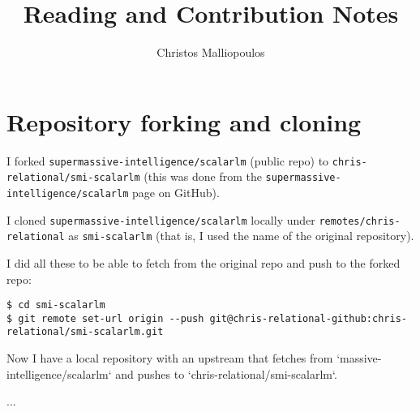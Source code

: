 \documentclass[a4paper, 10pt]{article}
\begin{document}
\title{Reading and Contribution Notes}
\author{Christos Malliopoulos}
\maketitle
\tableofcontents



\section{Repository forking and cloning}
I forked \texttt{supermassive-intelligence/scalarlm} (public repo) to \texttt{chris-relational/smi-scalarlm} (this was done from the \texttt{supermassive-intelligence/scalarlm} page on GitHub).

I cloned \texttt{supermassive-intelligence/scalarlm} locally under \texttt{remotes/chris-relational} as \texttt{smi-scalarlm} (that is, I used the name of the original repository).

I did all these to be able to fetch from the original repo and push to the forked repo:  
\begin{lstlisting}[style=all]
$ cd smi-scalarlm
$ git remote set-url origin --push git@chris-relational-github:chris-relational/smi-scalarlm.git
\end{lstlisting}

Now I have a local repository with an upstream that fetches from `massive-intelligence/scalarlm` and pushes to 
`chris-relational/smi-scalarlm`.



...
\end{document}
